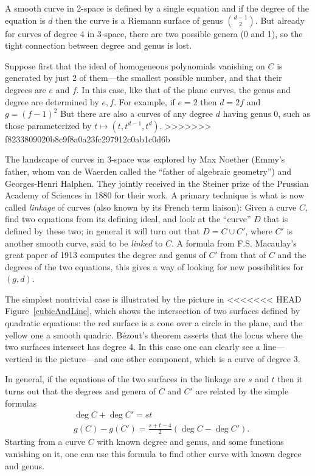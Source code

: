 \documentclass[11pt, oneside]{article}   	%
\begin{document}
A  smooth curve in 2-space is defined by a single equation and if the degree of the equation is $d$ then the curve is a Riemann surface of genus $d-1\choose 2$.
But already for curves of degree 4 in 3-space, there are two possible genera (0 and 1), so the tight connection between degree and genus is lost.

Suppose first that the ideal of homogeneous polynomials vanishing on $C$ is generated by just 2 of them---the smallest possible number, and that their degrees are $e$ and $f$. In this case,
like that of the plane curves, the genus and degree are determined by $e,f$. For example,
if $e=2$ then $d = 2f$ and $g = (f-1)^{2}$ But there are also a curves of any degree $d$ having genus 0, such as those parameterized by $t \mapsto (t, t^{d-1}, t^{d})$. 
>>>>>>> f8233809020b8c9f8a0a23fc297912c0ab1c0d6b

The landscape of curves in 3-space was explored by 
Max Noether (Emmy's father, whom van de Waerden called the ``father of algebraic geometry'') and Georges-Henri Halphen. They jointly received in the Steiner prize of the Prussian Academy of Sciences in 1880 for their work. A primary technique is what is now called \emph{linkage} of curves (also known by its French term liaison):  Given a curve $C$, find two equations from its defining ideal, and look at the ``curve'' $D$ that is defined by these two; in general it will turn out that $D = C\cup C'$, where $C'$ is another smooth curve, said to be \emph{linked} to $C$. A formula from F.S. Macaulay's great paper
of 1913 computes the degree and genus
of $C'$ from that of $C$ and the degrees of the two equations, this gives a way of looking for
new possibilities for $(g,d)$.

The simplest nontrivial case is illustrated by the picture in
<<<<<<< HEAD
Figure~\ref{cubicAndLine}, which shows the intersection of two surfaces defined by quadratic equations: the red surface is a cone over a circle in the plane, and the yellow one a smooth quadric.
B\'ezout's theorem asserts that the locus where the two surfaces intersect has degree 4. In this case one can clearly see a line---vertical in the picture---and one other component, which is a curve of degree 3.

In general, if the equations of the two surfaces in the linkage are $s$ and $t$ then it turns out that
the degrees and genera of $C$ and $C'$ are related by the simple formulas
\begin{align*}
&\deg C+\deg C' = st\\
&g(C) - g({C'}) = \frac{s+t-4}{2}(\deg C-\deg {C'}).
\end{align*}
Starting from a  curve $C$ with known degree and genus, and some functions vanishing on it, one can use this formula to find other curve with known degree and genus. 
\end{document}
